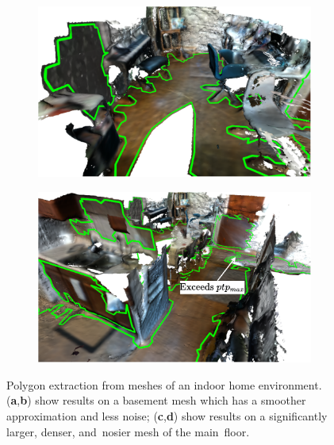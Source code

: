 \begin{figure}[H]
\begin{subfigure}[t]{.45\linewidth}
    \centering\includegraphics[clip,trim=0cm 0cm 0cm 0cm, width=.99\linewidth]{chapter_3_polylidar3d/imgs/meshes/mesh_polylidar3d_examples-mesh_mainfloor_two.pdf}
    \caption{\label{fig:ch3_mesh_example_c}}
  \end{subfigure}
  \hfill
  \begin{subfigure}[t]{.45\linewidth}
    \centering\includegraphics[clip,trim=0cm 0cm 0cm 0cm,width=.99\linewidth]{chapter_3_polylidar3d/imgs/meshes/mesh_polylidar3d_examples-mesh_mainfloor_one.pdf}
    \caption{\label{fig:ch3_mesh_example_d}}
  \end{subfigure}
  \caption{Polygon extraction from meshes of an indoor home environment. (\textbf{a},\textbf{b}) show results on a basement mesh which has a smoother approximation and less noise; (\textbf{c},\textbf{d}) show results on a significantly larger, denser, and~nosier mesh of the main~floor. }\label{fig:ch3_mesh_example}
\end{figure}
\unskip

